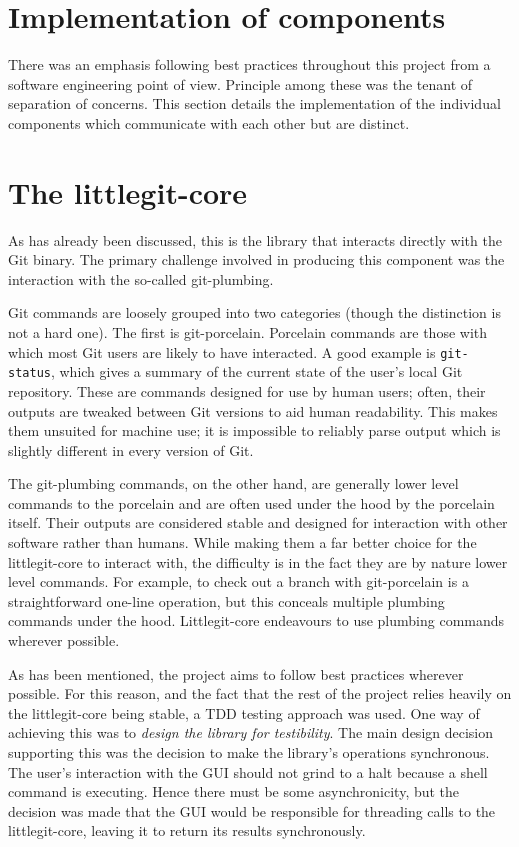 \section{Implementation of components}

There was an emphasis following best practices throughout this project from a software engineering point of view. Principle among these was the tenant of separation of concerns. This section details the implementation of the individual components which communicate with each other but are distinct. 

\section{The littlegit-core}

As has already been discussed, this is the library that interacts directly with the Git binary. The primary challenge involved in producing this component was the interaction with the so-called git-plumbing.

Git commands are loosely grouped into two categories (though the distinction is not a hard one). The first is git-porcelain. Porcelain commands are those with which most Git users are likely to have interacted. A good example is \texttt{git-status}, which gives a summary of the current state of the user's local Git repository. These are commands designed for use by human users; often, their outputs are tweaked between Git versions to aid human readability. This makes them unsuited for machine use; it is impossible to reliably parse output which is slightly different in every version of Git.

The git-plumbing commands, on the other hand, are generally lower level commands to the porcelain and are often used under the hood by the porcelain itself. Their outputs are considered stable and designed for interaction with other software rather than humans. While making them a far better choice for the littlegit-core to interact with, the difficulty is in the fact they are by nature lower level commands. For example, to check out a branch with git-porcelain is a straightforward one-line operation, but this conceals multiple plumbing commands under the hood. Littlegit-core endeavours to use plumbing commands wherever possible.

As has been mentioned, the project aims to follow best practices wherever possible. For this reason, and the fact that the rest of the project relies heavily on the littlegit-core being stable, a TDD testing approach was used. One way of achieving this was to \emph{design the library for testibility}. The main design decision supporting this was the decision to make the library's operations synchronous. The user's interaction with the GUI should not grind to a halt because a shell command is executing. Hence there must be some asynchronicity, but the decision was made that the GUI would be responsible for threading calls to the littlegit-core, leaving it to return its results synchronously.

